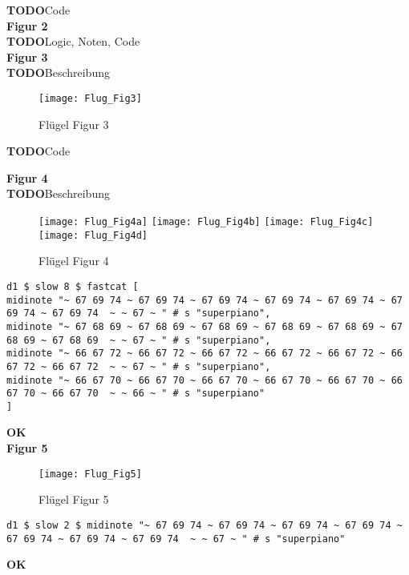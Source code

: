 \documentclass[
10pt, %
a4paper, %
oneside, %
headinclude,footinclude, %
BCOR5mm, %
]{scrartcl}
\begin{document}
{\color{red}\textbf{TODO}}Code\\

\noindent \textbf{Figur 2}\\
{\color{red}\textbf{TODO}}Logic, Noten, Code\\


\noindent \textbf{Figur 3}\\
{\color{red}\textbf{TODO}}Beschreibung\\
\begin{figure}[h]
	\centering 
	\texttt{[image: Flug\_Fig3]} 
	\caption{Flügel Figur 3}
\end{figure}
{\color{red}\textbf{TODO}}Code\\
\pagebreak

\noindent \textbf{Figur 4}\\
{\color{red}\textbf{TODO}}Beschreibung\\
\begin{figure}[h]
	\centering 
	\texttt{[image: Flug\_Fig4a]} 
	\texttt{[image: Flug\_Fig4b]} 
	\texttt{[image: Flug\_Fig4c]} 
	\texttt{[image: Flug\_Fig4d]} 
	\caption{Flügel Figur 4}
\end{figure}
\begin{lstlisting}
d1 $ slow 8 $ fastcat [
midinote "~ 67 69 74 ~ 67 69 74 ~ 67 69 74 ~ 67 69 74 ~ 67 69 74 ~ 67 69 74 ~ 67 69 74  ~ ~ 67 ~ " # s "superpiano",
midinote "~ 67 68 69 ~ 67 68 69 ~ 67 68 69 ~ 67 68 69 ~ 67 68 69 ~ 67 68 69 ~ 67 68 69  ~ ~ 67 ~ " # s "superpiano",
midinote "~ 66 67 72 ~ 66 67 72 ~ 66 67 72 ~ 66 67 72 ~ 66 67 72 ~ 66 67 72 ~ 66 67 72  ~ ~ 67 ~ " # s "superpiano",
midinote "~ 66 67 70 ~ 66 67 70 ~ 66 67 70 ~ 66 67 70 ~ 66 67 70 ~ 66 67 70 ~ 66 67 70  ~ ~ 66 ~ " # s "superpiano"
]
\end{lstlisting}
{\color{green}\textbf{OK}} \\


\noindent \textbf{Figur 5}\\
\begin{figure}[h]
	\centering 
	\texttt{[image: Flug\_Fig5]} 
	\caption{Flügel Figur 5}
\end{figure}
\begin{lstlisting}
d1 $ slow 2 $ midinote "~ 67 69 74 ~ 67 69 74 ~ 67 69 74 ~ 67 69 74 ~ 67 69 74 ~ 67 69 74 ~ 67 69 74  ~ ~ 67 ~ " # s "superpiano"
\end{lstlisting}
{\color{green}\textbf{OK}} \\
\end{document}
